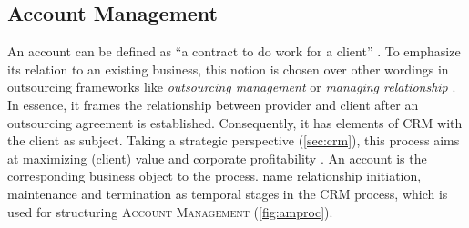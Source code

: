 	
	\subsection{Account Management}
		 \label{pr:acc}
	An account can be defined as \enquote{a contract to do work for a client} \citep{oxfordaccount}. To emphasize its relation to an existing business, this notion is chosen over other wordings in outsourcing frameworks like \textit{outsourcing management} \citep{Franceschini_2003} or \textit{managing relationship} \citep{perunovic2007outsourcing}. In essence, it frames the relationship between provider and client after an outsourcing agreement is established. Consequently, it has elements of \acrshort{CRM} with the client as subject. Taking a strategic perspective (\cf \ref{sec:crm}), this process aims at maximizing (client) value and corporate profitability \citep{payne2004role}. An account is the corresponding business object to the process. \cite{reinartz2004customer} name relationship initiation, maintenance and termination as temporal stages in the \acrshort{CRM} process, which is used for structuring \textsc{Account Management} (\Fig \ref{fig:amproc}).
	
